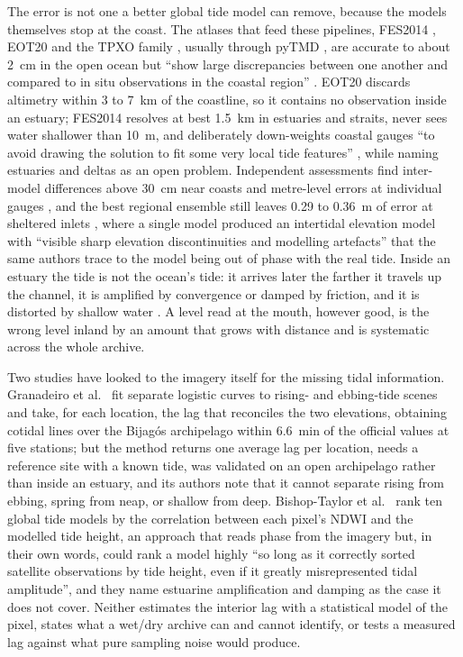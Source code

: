 \documentclass[final,5p,times,number]{elsarticle}
\begin{document}
The error is not one a better global tide model can remove, because the
models themselves stop at the coast. The atlases that feed these pipelines,
FES2014 \citep{lyard2021}, EOT20 \citep{hartdavis2021} and the TPXO family
\citep{egbert2002}, usually through pyTMD \citep{sutterley2025,fitzpatrick2024},
are accurate to about 2~cm in
the open ocean but ``show large discrepancies between one another and
compared to in situ observations in the coastal region''
\citep{hartdavis2021}. EOT20 discards altimetry within 3 to 7~km of the
coastline, so it contains no observation inside an estuary; FES2014
resolves at best 1.5~km in estuaries and straits, never sees water
shallower than 10~m, and deliberately down-weights coastal gauges ``to
avoid drawing the solution to fit some very local tide features''
\citep{lyard2021}, while naming estuaries and deltas as an open problem.
Independent assessments find inter-model differences above 30~cm near
coasts and metre-level errors at individual gauges \citep{wang2025}, and
the best regional ensemble still leaves 0.29 to 0.36~m of error at
sheltered inlets \citep{bishoptaylor2026}, where a single model produced an
intertidal elevation model with ``visible sharp elevation discontinuities
and modelling artefacts'' that the same authors trace to the model being
out of phase with the real tide. Inside an estuary the tide is not the
ocean's tide: it arrives later the farther it travels up the channel, it
is amplified by convergence or damped by friction, and it is distorted by
shallow water \citep{friedrichs1994,savenije2005}. A level read at the
mouth, however good, is the wrong level
inland by an amount that grows with distance and is systematic across the
whole archive.

Two studies have looked to the imagery itself for the missing tidal
information. Granadeiro et al.~\cite{granadeiro2021} fit separate logistic curves to
rising- and ebbing-tide scenes and take, for each location, the lag that
reconciles the two elevations, obtaining cotidal lines over the Bijag\'os
archipelago within 6.6~min of the official values at five stations; but
the method returns one average lag per location, needs a reference site
with a known tide, was validated on an open archipelago rather than inside
an estuary, and its authors note that it cannot separate rising from
ebbing, spring from neap, or shallow from deep. Bishop-Taylor et al.~\cite{bishoptaylor2026}
rank ten global tide models by the correlation between each pixel's NDWI
and the modelled tide height, an approach that reads phase from the
imagery but, in their own words, could rank a model highly ``so long as it
correctly sorted satellite observations by tide height, even if it greatly
misrepresented tidal amplitude'', and they name estuarine amplification and
damping as the case it does not cover. Neither estimates the interior lag
with a statistical model of the pixel, states what a wet/dry archive can
and cannot identify, or tests a measured lag against what pure sampling
noise would produce.
\end{document}
